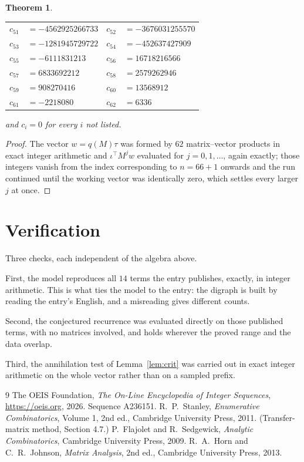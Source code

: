 \documentclass[11pt,a4paper]{article}
\theoremstyle{plain}
\newtheorem{theorem}{Theorem}
\theoremstyle{definition}
\begin{document}
\begin{theorem}
\begin{center}
\begin{tabular}{r@{\,}l@{\qquad}r@{\,}l}
$c_{51}$ & $=-4562925266733$ & $c_{52}$ & $=-3676031255570$ \\
$c_{53}$ & $=-1281945729722$ & $c_{54}$ & $=-452637427909$ \\
$c_{55}$ & $=-6111831213$ & $c_{56}$ & $=16718216566$ \\
$c_{57}$ & $=6833692212$ & $c_{58}$ & $=2579262946$ \\
$c_{59}$ & $=908270416$ & $c_{60}$ & $=13568912$ \\
$c_{61}$ & $=-2218080$ & $c_{62}$ & $=6336$ \\
\end{tabular}
\end{center}
and $c_i=0$ for every $i$ not listed.
\end{theorem}

\begin{proof}
The vector $w=q(M)\tau$ was formed by $62$ matrix--vector products in exact integer
arithmetic and $\iota^{\!\top}M^{j}w$ evaluated for $j=0,1,\dots$, again exactly; those
integers vanish from the index corresponding to $n=66+1$ onwards and the run continued
until the working vector was identically zero, which settles every larger $j$ at once.
\end{proof}

\section{Verification}

Three checks, each independent of the algebra above.

First, the model reproduces all $14$ terms the entry publishes, exactly, in integer
arithmetic. This is what ties the model to the entry: the digraph is built by reading the
entry's English, and a misreading gives different counts.

Second, the conjectured recurrence was evaluated directly on those published terms, with no
matrices involved, and holds wherever the proved range and the data overlap.

Third, the annihilation test of Lemma~\ref{lem:crit} was carried out in exact integer
arithmetic on the whole vector rather than on a sampled prefix.

\begin{thebibliography}{9}
 The OEIS Foundation, \emph{The On-Line Encyclopedia of Integer
Sequences}, \url{https://oeis.org}, 2026. Sequence A236151.
 R.~P.~Stanley, \emph{Enumerative Combinatorics}, Volume 1, 2nd ed.,
Cambridge University Press, 2011. (Transfer-matrix method, Section 4.7.)
 P.~Flajolet and R.~Sedgewick, \emph{Analytic Combinatorics}, Cambridge
University Press, 2009.
 R.~A.~Horn and C.~R.~Johnson, \emph{Matrix Analysis}, 2nd ed., Cambridge
University Press, 2013.
\end{thebibliography}
\end{document}
